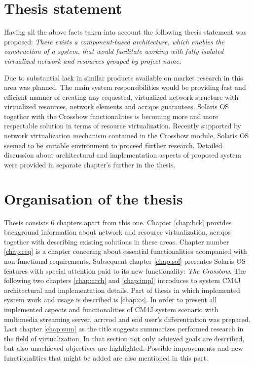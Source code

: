 \documentclass[11pt]{book}
\begin{document}
   \section{Thesis statement}

	Having all the above facts taken into account the following thesis statement was proposed:
	\emph{There exists a  component-based architecture, which enables the construction of a system, that would facilitate working with 
		fully  isolated virtualized network and resources grouped by project name.}

    Due to substantial lack in similar products available on market research in this area was planned.
    The main system responsibilities would be providing fast and efficient manner of creating any requested, 
    virtualized network structure with virtualized resources, network elements and \gls{acr:qos} guarantees. 
    Solaris OS together with the Crossbow functionalities is becoming more and more  respectable solution in terms
    of resource virtualization. Recently supported by network virtualization mechanism contained in the Crossbow 
    module, Solaris OS seemed to be suitable environment to proceed further research. Detailed discussion about 
    architectural and  implementation aspects of proposed system were provided in separate chapter's further in the thesis.


    \section{Organisation of the thesis}

      Thesis consists 6 chapters apart from this one. Chapter \ref{chap:bck} provides background information about
      network and resource virtualization,  \gls{acr:qos} together with describing existing solutions in these areas.
      Chapter number \ref{chap:req} is a chapter concering about essential functionalities acompanied with non-functional
       requirements. Subsequent chapter \ref{chap:sol} presentes Solaris OS features with special attention paid to its new
      functionality: \textit{The Crossbow}. The following two chapters \ref{chap:arch} and \ref{chap:impl} introduces to
      system CM4J architectural and implementation details. %
      Part of thesis in which implemented system work and usage is described is \ref{chap:cs}. In order to present all
      implemented aspects and functionalities of CM4J system scenario with multimedia streaming server, \gls{acr:vod}
      and end user's differentiation was prepared. Last chapter \ref{chap:sum} as the title suggests summarizes
      performed research in the field of virtualization. In that section not only achieved goals are described, but also
      unachieved objectives are highlighted. Possible improvements and new functionalities that might be added are also
      mentioned in this part. 
\end{document}
